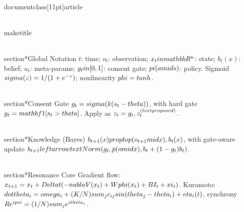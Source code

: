 \\documentclass[11pt]{article}
\begin{document}
\\maketitle

\\section*{Global Notation}
$t$: time; $o_t$: observation; $x_t\\in\\mathbb{R}^n$: state; $b_t(x)$: belief; $u_t$: meta-params; $g_t\\in[0,1]$: consent gate; $\\pi(a\\mid s)$: policy. Sigmoid $\\sigma(z)=1/(1+e^{-z})$; nonlinearity $\\phi = \\tanh$.

\\section*{Consent Gate}
$g_t = \\sigma(k(s_t-\\theta))$, with hard gate $g_t=\\mathbf{1}[s_t>\\theta]$. Apply as $z_t = g_t\\, z_t^{(\\text{proposed})}$.

\\section*{Knowledge (Bayes)}
$b_{t+1}(x) \\propto p(o_{t+1}\\mid x)\\, b_t(x)$, with gate-aware update
$b_{t+1} \\leftarrow \\text{Norm}( g_t\\, p(o\\mid x)\\, b_t + (1-g_t) b_t )$.

\\section*{Resonance Core}
Gradient flow: $x_{t+1} = x_t + \\Delta t ( -\\nabla V(x_t) + W\\phi(x_t) + B I_t + \\xi_t )$.
Kuramoto: $\\dot\\theta_i = \\omega_i + (K/N)\\sum_j c_{ij}\\sin(\\theta_j-\\theta_i)+\\eta_i(t)$, synchrony $R e^{i\\psi} = (1/N)\\sum_j e^{i\\theta_j}$.
\end{document}
